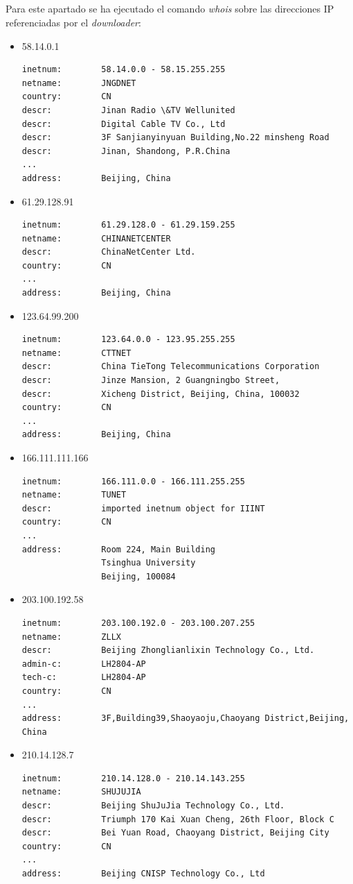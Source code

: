 \documentclass[10pt,a4paper]{article}
\begin{document}
\subsection{}
Para este apartado se ha ejecutado el comando \textit{whois} sobre las direcciones IP referenciadas por el \textit{downloader}:
\begin{itemize}
\item 58.14.0.1
\begin{lstlisting}
inetnum:        58.14.0.0 - 58.15.255.255
netname:        JNGDNET
country:        CN
descr:          Jinan Radio \&TV Wellunited
descr:          Digital Cable TV Co., Ltd
descr:          3F Sanjianyinyuan Building,No.22 minsheng Road
descr:          Jinan, Shandong, P.R.China
...
address:        Beijing, China
\end{lstlisting}
\item 61.29.128.91
\begin{lstlisting}
inetnum:        61.29.128.0 - 61.29.159.255
netname:        CHINANETCENTER
descr:          ChinaNetCenter Ltd.
country:        CN
...
address:        Beijing, China
\end{lstlisting}

\item 123.64.99.200
\begin{lstlisting}
inetnum:        123.64.0.0 - 123.95.255.255
netname:        CTTNET
descr:          China TieTong Telecommunications Corporation
descr:          Jinze Mansion, 2 Guangningbo Street,
descr:          Xicheng District, Beijing, China, 100032
country:        CN
...
address:        Beijing, China
\end{lstlisting}
\item 166.111.111.166
\begin{lstlisting}
inetnum:        166.111.0.0 - 166.111.255.255
netname:        TUNET
descr:          imported inetnum object for IIINT
country:        CN
...
address:        Room 224, Main Building
                Tsinghua University
                Beijing, 100084
\end{lstlisting}
\item 203.100.192.58
\begin{lstlisting}
inetnum:        203.100.192.0 - 203.100.207.255
netname:        ZLLX
descr:          Beijing Zhonglianlixin Technology Co., Ltd.
admin-c:        LH2804-AP
tech-c:         LH2804-AP
country:        CN
...
address:        3F,Building39,Shaoyaoju,Chaoyang District,Beijing, China
\end{lstlisting}

\item 210.14.128.7
\begin{lstlisting}
inetnum:        210.14.128.0 - 210.14.143.255
netname:        SHUJUJIA
descr:          Beijing ShuJuJia Technology Co., Ltd.
descr:          Triumph 170 Kai Xuan Cheng, 26th Floor, Block C
descr:          Bei Yuan Road, Chaoyang District, Beijing City
country:        CN
...
address:        Beijing CNISP Technology Co., Ltd
\end{lstlisting}

\end{itemize}
\end{document}
